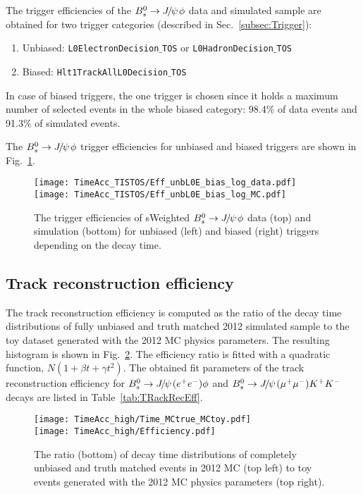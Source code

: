  The trigger efficiencies of the ${{B}^0_{s}}\rightarrow{\ensuremath{{J\mskip -3mu/\mskip -2mu\psi\mskip 2mu}}}\phi$ data and simulated sample are obtained for two trigger categories (described in Sec.~\ref{subsec:Trigger}):
 \begin{enumerate}
  \item Unbiased: {\tt L0ElectronDecision$\_$TOS} or {\tt L0HadronDecision$\_$TOS}
  \item Biased: {\tt Hlt1TrackAllL0Decision$\_$TOS}
 \end{enumerate}
 In case of biased triggers, the one trigger is chosen since it holds a maximum number of selected events in the whole biased category: 98.4$\%$ of data events and 91.3$\%$ of simulated events.
 
 The ${{B}^0_{s}}\rightarrow{\ensuremath{{J\mskip -3mu/\mskip -2mu\psi\mskip 2mu}}}\phi$ trigger efficiencies for unbiased and biased triggers are shown in Fig.~\ref{fig:TimeAccTISTOS}.
   \begin{figure}[hbt]
  \begin{center}
    \texttt{[image: TimeAcc\_TISTOS/Eff\_unbL0E\_bias\_log\_data.pdf]}\\ 
    \texttt{[image: TimeAcc\_TISTOS/Eff\_unbL0E\_bias\_log\_MC.pdf]}
  \end{center}
  \caption{
  The trigger efficiencies of sWeighted ${{B}^0_{s}}\rightarrow{\ensuremath{{J\mskip -3mu/\mskip -2mu\psi\mskip 2mu}}}\phi$ data (top) and simulation (bottom) for unbiased (left) and biased (right) triggers depending on the decay time. 
}
  \label{fig:TimeAccTISTOS}
\end{figure}
 
 
 \subsection{Track reconstruction efficiency}\label{subsec:TrackRecEff}
 
 The track reconstruction efficiency is computed as the ratio of the decay time distributions of fully unbiased and truth matched 2012 simulated sample to the toy dataset generated with the 2012 MC physics parameters. The resulting histogram is shown in Fig.~\ref{fig:TimeAccTrackRecEff}. The efficiency ratio is fitted with a quadratic function, $N(1+\beta t+\gamma t^{2})$. The obtained fit parameters of the track reconstruction efficiency for ${{B}^0_{s}}\rightarrow{\ensuremath{{J\mskip -3mu/\mskip -2mu\psi\mskip 2mu}}}({e^+e^-})\phi$ and ${{B}^0_{s}}\rightarrow{\ensuremath{{J\mskip -3mu/\mskip -2mu\psi\mskip 2mu}}}({\mu^+\mu^-}){{K}^+}{{K}^-}$~\cite{Aaij:2014-039} decays are listed in Table~\ref{tab:TRackRecEff}.
 
  \begin{figure}[hbt]
  \begin{center}
    \texttt{[image: TimeAcc\_high/Time\_MCtrue\_MCtoy.pdf]}\\ 
    \texttt{[image: TimeAcc\_high/Efficiency.pdf]}
  \end{center}
  \caption{
  The ratio (bottom) of decay time distributions of completely unbiased and truth matched events in 2012 MC (top left) to toy events generated with the 2012 MC physics parameters (top right).
}
  \label{fig:TimeAccTrackRecEff}
\end{figure}

